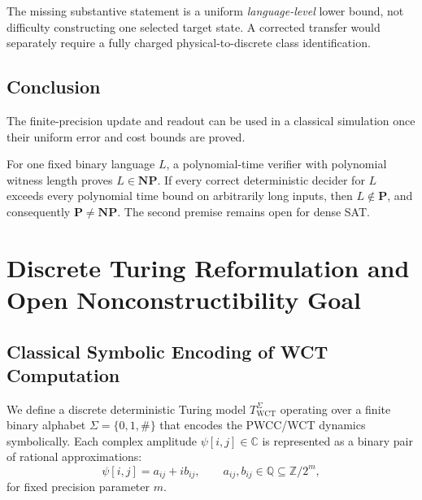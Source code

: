 \documentclass[12pt]{article}
\theoremstyle{remark}
\begin{document}
The missing substantive statement is a uniform
\emph{language-level} lower bound, not difficulty
constructing one selected target state.  A corrected
transfer would separately require a fully charged
physical-to-discrete class identification.

\subsection{Conclusion}

The finite-precision update and readout can be used in a classical
simulation once their uniform error and cost bounds are proved.

\begin{tcolorbox}
For one fixed binary language $L$, a polynomial-time verifier with polynomial
witness length proves $L\in\mathbf{NP}$. If every correct deterministic
decider for $L$ exceeds every polynomial time bound on arbitrarily long
inputs, then $L\notin\mathbf P$, and consequently $\mathbf P\ne\mathbf{NP}$.
The second premise remains open for dense SAT.

\end{tcolorbox}















\clearpage
\section{Discrete Turing Reformulation and Open Nonconstructibility Goal}

\subsection{Classical Symbolic Encoding of WCT Computation}

We define a discrete deterministic Turing model \( T_{\text{WCT}}^\Sigma \) operating over a finite binary alphabet \( \Sigma = \{0,1,\#\} \) that encodes the PWCC/WCT dynamics symbolically. Each complex amplitude \( \psi[i,j] \in \mathbb{C} \) is represented as a binary pair of rational approximations:
\[
\psi[i,j] = a_{ij} + i b_{ij}, \qquad a_{ij}, b_{ij} \in \mathbb{Q} \subseteq \mathbb{Z} / 2^m,
\]
for fixed precision parameter \(m\).  
\end{document}

